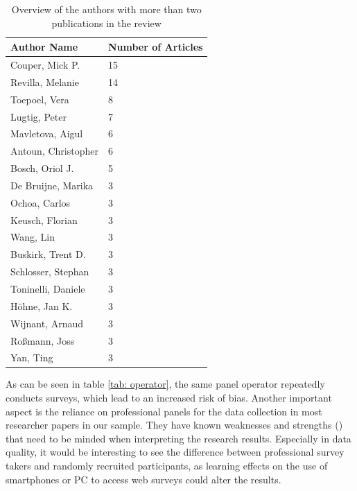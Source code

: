 \begin{table}
	\centering
	\begin{tabular}{ll}
		\toprule
		Author Name & Number of Articles \\
		\midrule
		Couper, Mick P. &        15 \\
        Revilla, Melanie &      14\\
        Toepoel, Vera  &         8\\
        Lugtig, Peter   &        7\\
        Mavletova, Aigul    &    6\\
        Antoun, Christopher  &   6\\
        Bosch, Oriol J.   &      5\\
        De Bruijne, Marika  &    3\\
        Ochoa, Carlos      &     3\\
        Keusch, Florian     &    3\\
        Wang, Lin           &    3\\
        Buskirk, Trent D.     &  3\\
        Schlosser, Stephan  &   3\\
        Toninelli, Daniele   &   3\\
        Höhne, Jan K.        &   3\\
        Wijnant, Arnaud      &   3\\
        Roßmann, Joss       &    3\\
        Yan, Ting            &   3\\
		\bottomrule 
	\end{tabular}
	\caption{Overview of the authors with more than two publications in the review}
	\label{tab: authors}
\end{table}

As can be seen in table \ref{tab: operator}, the same panel operator repeatedly conducts surveys, which lead to an increased risk of bias. Another important aspect is the reliance on professional panels for the data collection in most researcher papers in our sample. They have known weaknesses and strengths (\cite{callegaro_online_2014, kees_analysis_2017}) that need to be minded when interpreting the research results. Especially in data quality, it would be interesting to see the difference between professional survey takers and randomly recruited participants, as learning effects on the use of smartphones or PC to access web surveys could alter the results.


